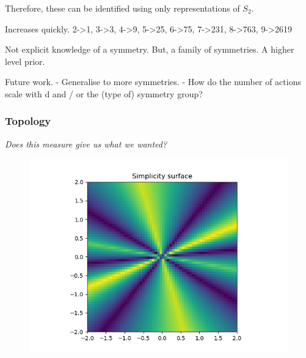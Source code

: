 Therefore, these can be identified using only representations of $S_2$.


Increases quickly. 2->1, 3->3, 4->9, 5->25, 6->75, 7->231, 8->763, 9->2619

Not explicit knowledge of a symmetry. But, a family of symmetries. A higher level prior.

Future work.
- Generalise to more symmetries.
- How do the number of actions scale with d and / or the (type of) symmetry group?



\subsubsection{Topology}

\begin{displayquote}
\textit{Does this measure give us what we wanted?}
\end{displayquote}

\begin{figure}[h!]
\centering
\includegraphics[width=1\textwidth,height=0.5\textheight]{../../pictures/figures/complexity_surface_nd-3d.png}
\caption{}
\end{figure}

